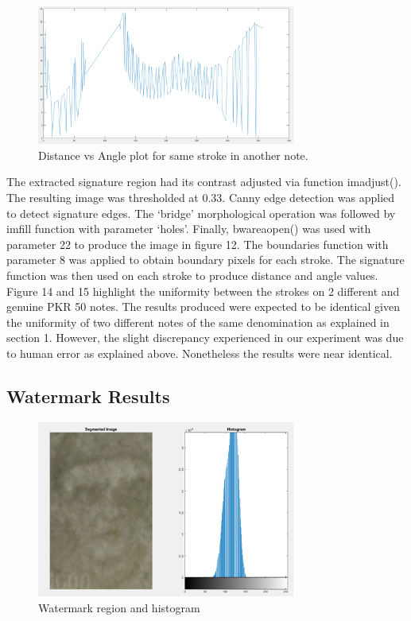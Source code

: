 \documentclass{article}
\begin{document}
\begin{figure}[h!]

\begin{minipage}[b]{1.0\linewidth}
  \centering
  \centerline{\includegraphics[width=8.5cm]{g3.png}}
  \vspace{-3mm}
\end{minipage}
%
\caption{Distance vs Angle plot for same stroke in another note.}
\label{fig:g3}
\vspace{-3mm}
\end{figure}
\newpage
The extracted signature region had its contrast adjusted via function imadjust(). The resulting image was thresholded at 0.33. Canny edge detection was applied to detect signature edges. The ‘bridge’ morphological operation was followed by imfill function with parameter ‘holes’. Finally, bwareaopen() was used with parameter 22 to produce the image in figure 12. The boundaries function with parameter 8 was applied to obtain boundary pixels for each stroke. The signature function was then used on each stroke to produce distance and angle values. Figure 14 and 15 highlight the uniformity between the strokes on 2 different and genuine PKR 50 notes. The results produced were expected to be identical given the uniformity of two different notes of the same denomination as explained in section 1. However, the slight discrepancy experienced in our experiment was due to human error as explained above. Nonetheless the results were near identical.
\newpage
\subsection{Watermark Results}
\begin{figure}[h!]

\begin{minipage}[b]{1.0\linewidth}
  \centering
  \centerline{\includegraphics[width=8.5cm]{w1.png}}
  \vspace{-3mm}
\end{minipage}
%
\caption{Watermark region and histogram}
\label{fig:w1}
\vspace{-3mm}
\end{figure}
\end{document}

